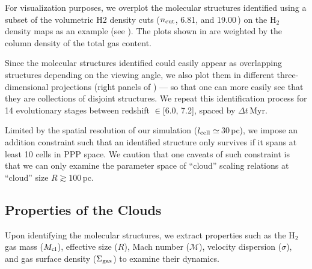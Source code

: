 \IfFileExists{emulateapjlegacy.cls}{\documentclass[iop]{emulateapjlegacy}}{\documentclass[iop]{emulateapj}}
\begin{document}
For visualization purposes, we overplot the molecular structures identified using a subset of the volumetric H2 density cuts
($n_{\rm cut}$, 6.81, and 19.00\,\cc) on the H$_2$ density maps as an example (see ).
The plots shown in  are weighted by the column density of the total gas content.

Since the molecular structures identified could easily appear as overlapping structures depending on the viewing angle, we also plot them in different three-dimensional projections (right panels of ) --- so that one can more easily see that they are collections of disjoint structures.
%
We repeat this identification process for 14 evolutionary stages between redshift \z$\in$[6.0, 7.2], spaced by $\Delta t$\,Myr.

Limited by the spatial resolution of our simulation ($l_{\rm cell}\simeq$\,30\,pc), we impose an addition constraint such that an identified structure only survives if it spans at least 10 cells in PPP space. We caution that one caveats of such constraint is that we can only examine the parameter space of ``cloud'' scaling relations at ``cloud'' size $R\gtrsim100$\,pc.

\subsection{Properties of the Clouds}

Upon identifying the molecular structures, we extract properties such as the H$_2$ gas mass ($M_{\rm cl}$), effective size ($R$), Mach number ($\mathcal{M}$), velocity dispersion ($\sigma$), and gas surface density ($\Sigma_{\rm gas}$) to examine their dynamics.
\end{document}
